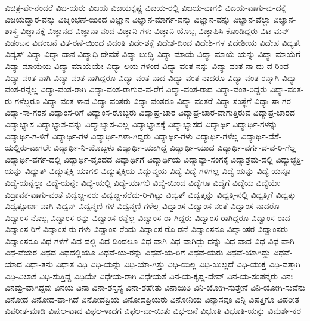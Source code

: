 {ವಿಚಿತ್ರ-ವೇ-ನೆಂದರೆ
ವಿಜ-ಯರು
ವಿಜಯ
ವಿಜಯಕೃಷ್ಣ
ವಿಜಯ-ರಲ್ಲಿ
ವಿಜಯ-ವಾಗಲಿ
ವಿಜಯ-ವಾಗು-ವು-ದಕ್ಕೆ
ವಿಜಯದ್ವಾರ-ವನ್ನು
ವಿಜೃಂಭಣೆ-ಯಿಂದ
ವಿಜ್ಞಾನ
ವಿಜ್ಞಾನ-ಮಾರ್ಗ-ವನ್ನು
ವಿಜ್ಞಾನ-ವನ್ನು
ವಿಜ್ಞಾನ-ವೆಲ್ಲಾ
ವಿಜ್ಞಾನ-ಶಾಸ್ತ್ರ
ವಿಜ್ಞಾನಕ್ಕೆ
ವಿಜ್ಞಾನದ
ವಿಜ್ಞಾನಾ-ನಂದ
ವಿಜ್ಞಾನಿ-ಗಳು
ವಿಜ್ಞಾನಿ-ಯೊಬ್ಬ
ವಿಜ್ಞಾಪಿಸಿ-ಕೊಂಡಿದ್ದರು
ವಿಟ-ಮನ್
ವಿಡಂಬನ
ವಿಡಂಬನೆ
ವಿತ-ರಣೆ-ಯಿಂದ
ವಿದಂತಿ
ವಿದೇ-ಶಕ್ಕೆ
ವಿದೇಶ-ದಿಂದ
ವಿದೇಶಿ-ಗಳ
ವಿದೇಶೀಯ
ವಿದೇಹ
ವಿದ್ಯತೇ
ವಿದ್ಯತ್
ವಿದ್ಯಾ
ವಿದ್ಯಾ-ದಾನ
ವಿದ್ಯಾಧಿ-ದೇವತೆ
ವಿದ್ಯಾ-ಬುದ್ಧಿ
ವಿದ್ಯಾ-ಮಾಯೆ
ವಿದ್ಯಾ-ಮಾಯೆ-ಯನ್ನು
ವಿದ್ಯಾ-ಮಾಯೆಗೆ
ವಿದ್ಯಾ-ಮಾಯೆಯ
ವಿದ್ಯಾ-ಮಾಯೆಯೇ
ವಿದ್ಯಾ-ಲಯ-ಗಳಿಂದ
ವಿದ್ಯಾ-ವಂತ-ನನ್ನು
ವಿದ್ಯಾ-ವಂತ-ನಾ-ದು-ದ-ರಿಂದ
ವಿದ್ಯಾ-ವಂತ-ನಾಗಿ
ವಿದ್ಯಾ-ವಂತ-ನಾಗಿದ್ದರೂ
ವಿದ್ಯಾ-ವಂತ-ನಾದ
ವಿದ್ಯಾ-ವಂತ-ನಾದರೂ
ವಿದ್ಯಾ-ವಂತ-ರನ್ನಾಗಿ
ವಿದ್ಯಾ-ವಂತ-ರನ್ನೆಲ್ಲ
ವಿದ್ಯಾ-ವಂತ-ರಾಗಿ
ವಿದ್ಯಾ-ವಂತ-ರಾಗುವ-ವ-ರೆಗೆ
ವಿದ್ಯಾ-ವಂತ-ರಾದ
ವಿದ್ಯಾ-ವಂತ-ರಿದ್ದರು
ವಿದ್ಯಾ-ವಂತ-ರು-ಗಳೆಲ್ಲರೂ
ವಿದ್ಯಾ-ವಂತ-ಳಾದ
ವಿದ್ಯಾ-ವಂತರು
ವಿದ್ಯಾ-ವಂತರೂ
ವಿದ್ಯಾ-ವಂತರೆ
ವಿದ್ಯಾ-ಸಂಸ್ಥೆಗೆ
ವಿದ್ಯಾ-ಸಾ-ಗರ
ವಿದ್ಯಾ-ಸಾ-ಗರನ
ವಿದ್ಯಾಂಸ-ರಿಗೆ
ವಿದ್ಯಾಂಸ-ರೊಬ್ಬರು
ವಿದ್ಯಾಪ್ರ-ಚಾರ
ವಿದ್ಯಾಪ್ರ-ಚಾರ-ವಾಗುತ್ತಿರುವ
ವಿದ್ಯಾಪ್ರ-ಚಾರದ
ವಿದ್ಯಾಭ್ಯಾಸ
ವಿದ್ಯಾಭ್ಯಾಸ-ವನ್ನು
ವಿದ್ಯಾಭ್ಯಾಸ-ವಿಲ್ಲ
ವಿದ್ಯಾಭ್ಯಾಸಕ್ಕೆ
ವಿದ್ಯಾಭ್ಯಾಸದ
ವಿದ್ಯಾರ್ಥಿ
ವಿದ್ಯಾರ್ಥಿ-ಗಳನ್ನು
ವಿದ್ಯಾರ್ಥಿ-ಗ-ಳಿಗೆ
ವಿದ್ಯಾರ್ಥಿ-ಗಳ
ವಿದ್ಯಾರ್ಥಿ-ಗಳಾ-ಗಿದ್ದರು
ವಿದ್ಯಾರ್ಥಿ-ಗಳು
ವಿದ್ಯಾರ್ಥಿ-ಗಳೆಲ್ಲ
ವಿದ್ಯಾರ್ಥಿ-ದೆಸೆ-ಯಲ್ಲಿರು-ವಾಗಲೇ
ವಿದ್ಯಾರ್ಥಿ-ನಿ-ಯೊಬ್ಬಳು
ವಿದ್ಯಾರ್ಥಿ-ಯಾಗಿದ್ದ
ವಿದ್ಯಾರ್ಥಿ-ಯಾದ
ವಿದ್ಯಾರ್ಥಿ-ವರ್ಗ-ದ-ವ-ರಿ-ಗೆಲ್ಲ
ವಿದ್ಯಾರ್ಥಿ-ವರ್ಗ-ದಲ್ಲಿ
ವಿದ್ಯಾರ್ಥಿ-ವೃಂದದ
ವಿದ್ಯಾರ್ಥಿಗೆ
ವಿದ್ಯಾರ್ಥಿಯ
ವಿದ್ಯಾವ್ಯಾ-ಸಂಗಕ್ಕೆ
ವಿದ್ಯಾಶ್ರಮ-ದಲ್ಲಿ
ವಿದ್ಯುಚ್ಛಕ್ತಿ-ಯನ್ನು
ವಿದ್ಯುತ್
ವಿದ್ಯುತ್ಶಕ್ತಿ-ಯಾಗಲಿ
ವಿದ್ಯುತ್ಶಕ್ತಿಯ
ವಿದ್ಯುನ್ಮಯ
ವಿದ್ಯೆ
ವಿದ್ಯೆ-ಗಳಿಗಲ್ಲ
ವಿದ್ಯೆ-ಯನ್ನು
ವಿದ್ಯೆ-ಯನ್ನೂ
ವಿದ್ಯೆ-ಯನ್ನೆಲ್ಲಾ
ವಿದ್ಯೆ-ಯನ್ನೇ
ವಿದ್ಯೆ-ಯಲ್ಲಿ
ವಿದ್ಯೆ-ಯಾಗಲಿ
ವಿದ್ಯೆ-ಯಿಂದ
ವಿದ್ಯೆಗೂ
ವಿದ್ಯೆಗೆ
ವಿದ್ಯೆಯ
ವಿದ್ಯೆಯೇ
ವಿದ್ರಾವಕ-ವಾಗು-ವಂತೆ
ವಿದ್ವಜ್ಜ-ನರು
ವಿದ್ವಜ್ಜ-ನರೆದು-ರಿ-ಗಿಟ್ಟು
ವಿದ್ವತ್
ವಿದ್ವತ್ತನ್ನು
ವಿದ್ವತ್ತಿ-ನಲ್ಲಿ
ವಿದ್ವತ್ತಿಗೆ
ವಿದ್ವತ್ತು
ವಿದ್ವತ್ಪೂರ್ಣ-ವಾಗಿ
ವಿದ್ವನ್
ವಿದ್ವನ್ಮಣಿ-ಗಳ
ವಿದ್ವನ್ಮಣಿ-ಗಳೆಲ್ಲ
ವಿದ್ವಾಂಸ
ವಿದ್ವಾಂಸ-ನಂತೆ
ವಿದ್ವಾಂಸ-ನಾದರೊ
ವಿದ್ವಾಂಸ-ನೊಬ್ಬ
ವಿದ್ವಾಂಸ-ರನ್ನು
ವಿದ್ವಾಂಸ-ರನ್ನೆಲ್ಲ
ವಿದ್ವಾಂಸ-ರಾ-ಗಿದ್ದರು
ವಿದ್ವಾಂಸ-ರಾಗಿದ್ದರೂ
ವಿದ್ವಾಂಸ-ರಾದ
ವಿದ್ವಾಂಸ-ರಿಗೆ
ವಿದ್ವಾಂಸ-ರು-ಗಳು
ವಿದ್ವಾಂಸ-ರೆಂದು
ವಿದ್ವಾಂಸ-ರೊ-ಡನೆ
ವಿದ್ವಾಂಸನೂ
ವಿದ್ವಾಂಸರ
ವಿದ್ವಾಂಸರು
ವಿದ್ವಾಂಸರೂ
ವಿಧ-ಗಳಗೆ
ವಿಧ-ದಲ್ಲಿ
ವಿಧ-ದಿಂದಲೂ
ವಿಧ-ವಾಗಿ
ವಿಧ-ವಾಗಿದ್ದು-ದನ್ನು
ವಿಧ-ವಾದ
ವಿಧ-ವಿಧ-ವಾಗಿ
ವಿಧ-ವೆಯರ
ವಿಧದ
ವಿಧದಲ್ಲಿಯೂ
ವಿಧವೆ-ಯ-ರನ್ನು
ವಿಧವೆ-ಯ-ರಿಗೆ
ವಿಧವೆ-ಯರು
ವಿಧವೆ-ಯಾಗಿದ್ದು
ವಿಧವೆ-ಯಾದ
ವಿಧಾ-ತನು
ವಿಧಾತ
ವಿಧಿ
ವಿಧಿ-ಯನ್ನು
ವಿಧಿ-ಯಾ-ಗಿತ್ತು
ವಿಧಿ-ಯಿಲ್ಲ
ವಿಧಿ-ಯಿಲ್ಲದೆ
ವಿಧಿ-ಯುಕ್ತ
ವಿಧಿ-ವತ್ತಾಗಿ
ವಿಧಿ-ವಿಲಾಸ
ವಿಧಿ-ಸುತ್ತಿದ್ದ
ವಿಧಿಯೇ
ವಿಧೇಯ-ರಾಗಿ
ವಿಧೇಯತೆ
ವಿನ-ಯ-ಕೃಷ್ಣ-ದೇವ್
ವಿನ-ಯ-ಸಂಪನ್ನರು
ವಿನಃ
ವಿನಮ್ರ-ವಾಗಿದ್ದವು
ವಿನಯ
ವಿನಾ
ವಿನಾ-ಶಸ್ತಸ್ಯ
ವಿನಾ-ಶಹೇತು
ವಿನಾಯಿತಿ
ವಿನಿ-ಯೋಗಿ-ಸುತ್ತೇನೆ
ವಿನಿ-ಯೋಗಿ-ಸುವೆನು
ವಿನೋದ
ವಿನೋದ-ವಾ-ಗಿದೆ
ವಿನೋದಪ್ರಿಯ
ವಿನೋದಪ್ರಿಯರು
ವಿನೋನಿಯ
ವಿನ್ಯಾಸವೂ
ವಿನ್ಸಿ
ವಿಪತ್ತಿಗೂ
ವಿಪರೀತ
ವಿಪರೀತ-ಮಾಡಿ
ವಿಪುಲ-ವಾದ
ವಿಫಲ-ಳಾದಗ
ವಿಫಲ-ವಾ-ಯಿತು
ವಿಭ-ಜನೆ
ವಿಭೂತಿ
ವಿಭೂತಿ-ಯನ್ನು
ವಿಮರ್ಶ-ಕರ
}
